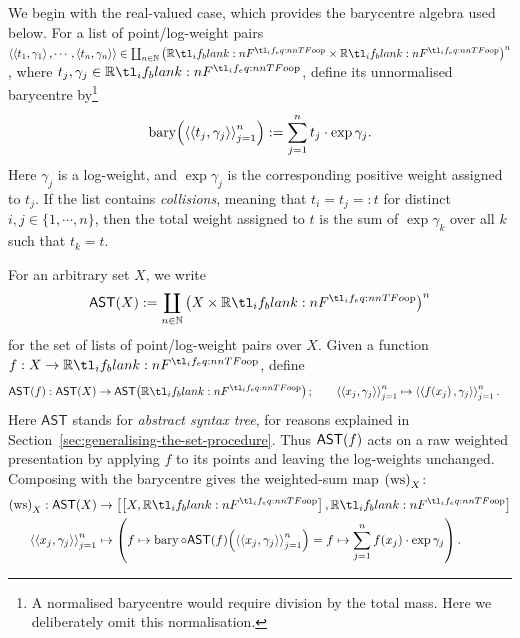 \documentclass[11pt,a4paper]{article}
\theoremstyle{definition}
\theoremstyle{remark}
\providecommand{\N}{\mathbb{N}}
\providecommand{\AST}{\mathsf{AST}}
\providecommand{\ws}{\operatorname{ws}}
\providecommand{\bary}{\operatorname{bary}}
\begin{document}
We begin with the real-valued case, which provides the barycentre algebra used
below. For a list of point/log-weight pairs
\(
\tuple{
	\tuple{t_{1}, \gamma_{1}},
	\cdots,
	\tuple{t_{n}, \gamma_{n}}
}
\in \coprod_{n \in \N} \left( \R \times \R \right)^{n}\),
where \( t_{j},\gamma_{j}\in\R \), define its unnormalised barycentre by\footnote{A normalised barycentre would require division by the total mass. Here we deliberately omit this normalisation.}
\begin{equation}
	\label{eq:barycentre-in-set}
	\fn[n]{ \bary }{
		\tuple{
			\tuple{t_{j}, \gamma_{j}}
		}_{j = 1}^{n}
	} :=
	\sum_{j = 1}^{n} t_{j} \cdot \exp \gamma_{j}.
\end{equation}
Here \( \gamma_{j} \) is a log-weight, and \( \exp\gamma_{j} \) is the
corresponding positive weight assigned to \(t_j\). If the list contains
\emph{collisions}, meaning that \( t_{i}=t_{j}=:t \) for distinct
\( i,j\in\{1,\cdots,n\} \), then the total weight assigned to \(t\) is the sum
of \( \exp\gamma_{k} \) over all \(k\) such that \(t_k=t\).

For an arbitrary set \(X\), we write
\[
\Fun[nn]{ \AST }{ X }
:=
\coprod_{n \in \N} \left( X \times \R \right)^{n}
\]
for the set of lists of point/log-weight pairs over \(X\). Given a function
\( f:X\to\R \), define
\begin{equation}
	\label{eq:definition-ast-in-set}
	\begin{aligned}
		\Fun[nn]{ \AST }{ f }:
		\Fun[nn]{ \AST }{ X } &\to \Fun[nn]{ \AST }{ \R };\qquad
		\tuple{\tuple{x_{j}, \gamma_{j}}}_{j = 1}^{n}
		\mapsto
		\tuple{\tuple{\fn[n]{ f }{ x_{j} }, \gamma_{j}}}_{j = 1}^{n}.
	\end{aligned}
\end{equation}
Here \( \AST \) stands for \emph{abstract syntax tree}, for reasons explained
in Section~\ref{sec:generalising-the-set-procedure}. Thus
\( \Fun[nn]{ \AST }{ f } \) acts on a raw weighted presentation by applying
\(f\) to its points and leaving the log-weights unchanged. Composing with the
barycentre gives the weighted-sum map \( \Nat[nn]{ \ws }{ X } \):
\begin{equation}
	\label{eq:weighted-sum-definition-in-set}
	\begin{aligned}
		\Nat[nn]{ \ws }{ X }:
		\Fun[nn]{ \AST }{ X }
		&\to \inthom{\inthom{X}{\R}}{\R}
		\\
		\tuple{\tuple{x_{j}, \gamma_{j}}}_{j = 1}^{n}
		&\mapsto
		\left(
		f \mapsto  \fn[p]{ \bary \circ \Fun[nn]{ \AST }{ f } }{
			\tuple{\tuple{x_{j}, \gamma_{j}}}_{j = 1}^{n}
		}
		=  f \mapsto \sum_{j = 1}^{n} \fn[n]{ f }{ x_{j} } \cdot \exp \gamma_{j}
		\right).
	\end{aligned}
\end{equation}
\end{document}
